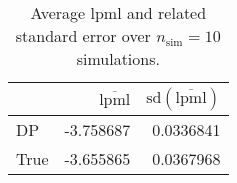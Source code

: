 \begin{table}[H]

\caption{Average lpml and related standard error over $n_{\text{sim}} = 10$ simulations.}
\centering
\begin{tabular}[t]{lrr}
\toprule
  & $\overbar{\text{lpml}}$ & $\text{sd}(\overbar{\text{lpml}})$\\
\midrule
DP & -3.758687 & 0.0336841\\
True & -3.655865 & 0.0367968\\
\bottomrule
\end{tabular}
\end{table}